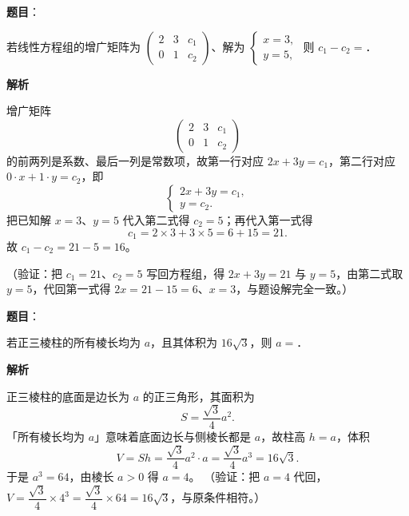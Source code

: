 \begin{answer}

\textbf{题目}：

若线性方程组的增广矩阵为 $\begin{pmatrix} 2 & 3 & c_{1}\\ 0 & 1 & c_{2} \end{pmatrix}$、解为 $\begin{cases} x=3,\\ y=5, \end{cases}$ 则 \(c_{1}-c_{2}=\)\gkblank{}．

\textbf{解析}

增广矩阵
\nopagebreak[4]
\[
\begin{pmatrix} 2 & 3 & c_{1}\\ 0 & 1 & c_{2} \end{pmatrix}
\]
的前两列是系数、最后一列是常数项，故第一行对应 \(2x+3y=c_{1}\)，第二行对应 \(0\cdot x+1\cdot y=c_{2}\)，即
\nopagebreak[4]
\[
\begin{cases}
2x+3y=c_{1},\\
y=c_{2}.
\end{cases}
\]
把已知解 \(x=3\)、\(y=5\) 代入第二式得 \(c_{2}=5\)；再代入第一式得
\nopagebreak[4]
\[
c_{1}=2\times3+3\times5=6+15=21.
\]
故 \(c_{1}-c_{2}=21-5=16\)。

（验证：把 \(c_{1}=21\)、\(c_{2}=5\) 写回方程组，得 \(2x+3y=21\) 与 \(y=5\)，由第二式取 \(y=5\)，代回第一式得 \(2x=21-15=6\)、\(x=3\)，与题设解完全一致。）


\end{answer}
\begin{answer}

\textbf{题目}：

若正三棱柱的所有棱长均为 \(a\)，且其体积为 \(16\sqrt{3}\)，则 \(a=\)\gkblank{}．

\textbf{解析}

正三棱柱的底面是边长为 \(a\) 的正三角形，其面积为
\nopagebreak[4]
\[
S=\frac{\sqrt{3}}{4}a^{2}.
\]
「所有棱长均为 \(a\)」意味着底面边长与侧棱长都是 \(a\)，故柱高 \(h=a\)，体积
\nopagebreak[4]
\[
V=Sh=\frac{\sqrt{3}}{4}a^{2}\cdot a=\frac{\sqrt{3}}{4}a^{3}=16\sqrt{3}.
\]
于是 \(a^{3}=64\)，由棱长 \(a>0\) 得 \(a=4\)。
（验证：把 \(a=4\) 代回，\(V=\dfrac{\sqrt{3}}{4}\times4^{3}=\dfrac{\sqrt{3}}{4}\times64=16\sqrt{3}\)，与原条件相符。）


\end{answer}
